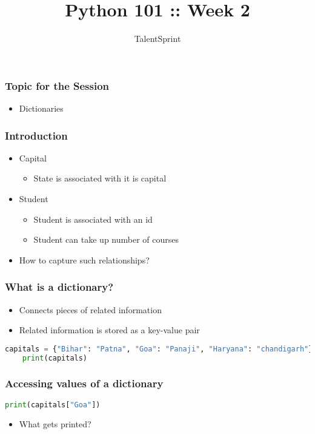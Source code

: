 \documentclass[14pt]{beamer}
\title{Python 101 :: Week 2}
\date{}
\author[TS]{TalentSprint}
\begin{document}
    \begin{frame}
        \titlepage
    \end{frame}
    \begin{frame}
	\frametitle{Topic for the Session}
	\begin{itemize}
		\item Dictionaries
	\end{itemize}
    \end{frame}
    \begin{frame}
        \frametitle{Introduction}
	\begin{itemize}
	\item Capital
		\begin{itemize}
			\item State is associated with it is capital
		\end{itemize}
	\item Student
		\begin{itemize}
			\item Student is associated with an id
			\item Student can take up number of courses
		\end{itemize}
	\pause
	\item \alert{How to capture such relationships?}
	\end{itemize}
    \end{frame}
    \begin{frame}[containsverbatim]
	\frametitle{What is a dictionary?}
	\begin{itemize}
		\item Connects pieces of related information
		\item Related information is stored as a key-value pair
	\end{itemize}
	\begin{lstlisting}[language=python]
	capitals = {"Bihar": "Patna", "Goa": "Panaji", "Haryana": "chandigarh"}
	print(capitals)
	\end{lstlisting}
    \end{frame}
    \begin{frame}[containsverbatim]
	\frametitle{Accessing values of a dictionary}
	\begin{lstlisting}[language=python]
	print(capitals["Goa"])
	\end{lstlisting}
	\begin{itemize} \item What gets printed? \end{itemize}
     \end{frame}
\end{document}
